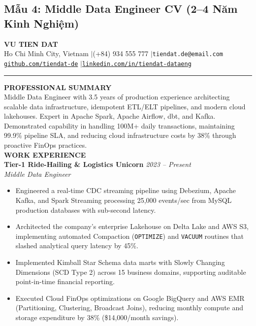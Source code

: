 \subsection{Mẫu 4: Middle Data Engineer CV (2--4 Năm Kinh Nghiệm)}
\begin{samplecvbox}
{\centering
    {\LARGE \textbf{VU TIEN DAT}}\\[2pt]
    \small Ho Chi Minh City, Vietnam \enspace$|$\enspace (+84) 934 555 777 \enspace$|$\enspace \texttt{tiendat.de@email.com}\\
    \href{https://github.com/tiendat-de}{\texttt{github.com/tiendat-de}} \enspace$|$\enspace \href{https://linkedin.com/in/tiendat-dataeng}{\texttt{linkedin.com/in/tiendat-dataeng}}\\[6pt]
}
\hrule\vspace{6pt}

\textbf{\large PROFESSIONAL SUMMARY}\\
Middle Data Engineer with 3.5 years of production experience architecting scalable data infrastructure, idempotent ETL/ELT pipelines, and modern cloud lakehouses. Expert in Apache Spark, Apache Airflow, dbt, and Kafka. Demonstrated capability in handling 100M+ daily transactions, maintaining 99.9\% pipeline SLA, and reducing cloud infrastructure costs by 38\% through proactive FinOps practices.\\[6pt]

\textbf{\large WORK EXPERIENCE}\\
\textbf{Tier-1 Ride-Hailing \& Logistics Unicorn} \hfill \textit{2023 -- Present}\\
\textit{Middle Data Engineer}
\begin{itemize}[leftmargin=12pt, nosep]
    \item Engineered a real-time CDC streaming pipeline using Debezium, Apache Kafka, and Spark Streaming processing 25,000 events/sec from MySQL production databases with sub-second latency.
    \item Architected the company's enterprise Lakehouse on Delta Lake and AWS S3, implementing automated Compaction (\texttt{OPTIMIZE}) and \texttt{VACUUM} routines that slashed analytical query latency by 45\%.
    \item Implemented Kimball Star Schema data marts with Slowly Changing Dimensions (SCD Type 2) across 15 business domains, supporting auditable point-in-time financial reporting.
    \item Executed Cloud FinOps optimizations on Google BigQuery and AWS EMR (Partitioning, Clustering, Broadcast Joins), reducing monthly compute and storage expenditure by 38\% (\$14,000/month savings).
\end{itemize}\vspace{4pt}


\end{samplecvbox}
